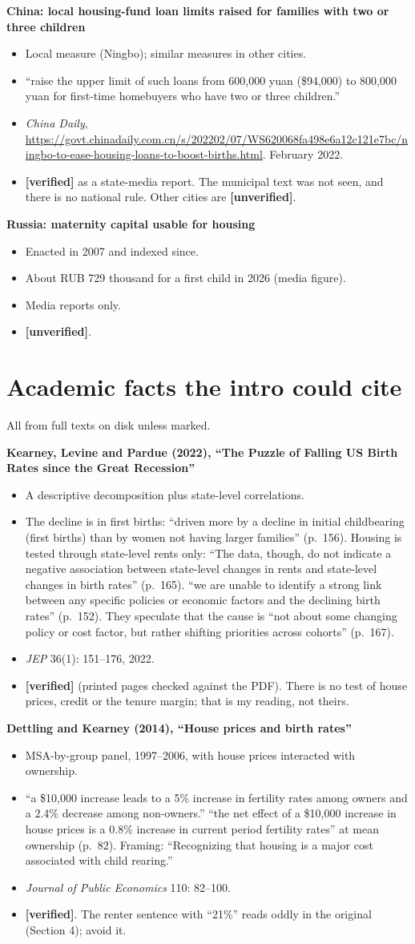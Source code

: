 \documentclass[10pt]{article}
\newcommand{\ok}{\textcolor{green!45!black}{\textbf{[verified]}}}
\newcommand{\unv}{\textcolor{red!70!black}{\textbf{[unverified]}}}
\newcommand{\entry}[5]{%
  \textbf{#1}\par
  \begin{itemize}
    \item #2
    \item #3
    \item #4
    \item #5
  \end{itemize}}
\begin{document}
\entry{China: local housing-fund loan limits raised for families with two or three children}
{Local measure (Ningbo); similar measures in other cities.}
{``raise the upper limit of such loans from 600,000 yuan (\$94,000) to 800,000 yuan for first-time homebuyers who have two or three children.''}
{\emph{China Daily}, \url{https://govt.chinadaily.com.cn/s/202202/07/WS620068fa498e6a12c121e7bc/ningbo-to-ease-housing-loans-to-boost-births.html}. February 2022.}
{\ok{} as a state-media report. The municipal text was not seen, and there is no national rule. Other cities are \unv.}

\entry{Russia: maternity capital usable for housing}
{Enacted in 2007 and indexed since.}
{About RUB 729 thousand for a first child in 2026 (media figure).}
{Media reports only.}
{\unv.}

\section{Academic facts the intro could cite}
All from full texts on disk unless marked.

\entry{Kearney, Levine and Pardue (2022), ``The Puzzle of Falling US Birth Rates since the Great Recession''}
{A descriptive decomposition plus state-level correlations.}
{The decline is in first births: ``driven more by a decline in initial childbearing (first births) than by women not having larger families'' (p.~156). Housing is tested through state-level rents only: ``The data, though, do not indicate a negative association between state-level changes in rents and state-level changes in birth rates'' (p.~165). ``we are unable to identify a strong link between any specific policies or economic factors and the declining birth rates'' (p.~152). They speculate that the cause is ``not about some changing policy or cost factor, but rather shifting priorities across cohorts'' (p.~167).}
{\emph{JEP} 36(1): 151--176, 2022.}
{\ok{} (printed pages checked against the PDF). There is no test of house prices, credit or the tenure margin; that is my reading, not theirs.}

\entry{Dettling and Kearney (2014), ``House prices and birth rates''}
{MSA-by-group panel, 1997--2006, with house prices interacted with ownership.}
{``a \$10,000 increase leads to a 5\% increase in fertility rates among owners and a 2.4\% decrease among non-owners.'' ``the net effect of a \$10,000 increase in house prices is a 0.8\% increase in current period fertility rates'' at mean ownership (p.~82). Framing: ``Recognizing that housing is a major cost associated with child rearing.''}
{\emph{Journal of Public Economics} 110: 82--100.}
{\ok. The renter sentence with ``21\%'' reads oddly in the original (Section 4); avoid it.}
\end{document}
